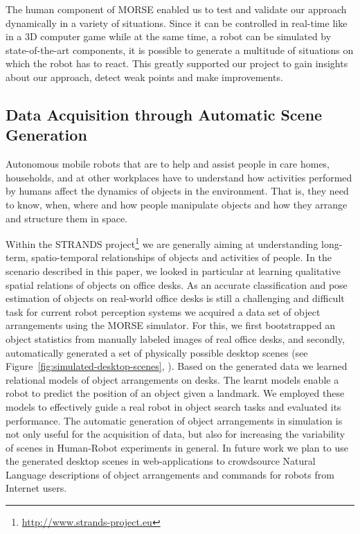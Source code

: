 \documentclass[conference]{IEEEtran}
\begin{document}
The human component of MORSE enabled us to test and validate our approach dynamically in a variety of situations. Since it can be controlled in real-time like in a 3D computer game while at the same time, a robot can be simulated by state-of-the-art components, it is possible to generate a multitude of situations on which the robot has to react. This greatly supported our project to gain insights about our approach, detect weak points and make improvements.

\subsection{Data Acquisition through Automatic Scene Generation}
\label{scenario3}

Autonomous mobile robots that are to help and assist people in care homes,
households, and at other workplaces have to understand how activities performed
by humans affect the dynamics of objects in the environment. That is, they need
to know, when, where and how people manipulate objects and how they arrange and
structure them in space.

Within the STRANDS project\footnote{\url{http://www.strands-project.eu}} we are
generally aiming at understanding long-term, spatio-temporal relationships of
objects and activities of people. In the scenario described in this paper, we
looked in particular at learning qualitative spatial relations of objects on
office desks. As an accurate classification and pose estimation of objects on
real-world office desks is still a challenging and difficult task for current
robot perception systems we acquired a data set of object arrangements using
the MORSE simulator. For this, we first bootstrapped an object statistics from
manually labeled images of real office desks, and secondly, automatically
generated a set of physically possible desktop scenes (see
Figure~\ref{fig:simulated-desktop-scenes}, \cite{kunze14bootstrapping}). Based
on the generated data we learned relational models of object arrangements on
desks. The learnt models enable a robot to predict the position of an object
given a landmark. We employed these models to effectively guide a real robot in
object search tasks \cite{kunze14indirect} and evaluated its performance. The
automatic generation of object arrangements in simulation is not only useful
for the acquisition of data, but also for increasing the variability of scenes
in Human-Robot experiments in general. In future work we plan to use the
generated desktop scenes in web-applications to crowdsource Natural Language
descriptions of object arrangements and commands for robots from Internet
users.
\end{document}
